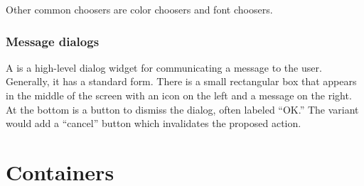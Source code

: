 Other common choosers are color choosers and font choosers.

\subsubsection{Message dialogs}
\label{sec:GUI:message-dialogs}

A  is a high-level dialog widget for
communicating a message to the user. Generally, it has a standard
form. There is a small rectangular box that appears in the middle of
the screen with an icon on the left and a message on the right. At the
bottom is a button to dismiss the dialog, often labeled ``OK.'' The
 variant would add a ``cancel'' button
which invalidates the proposed action.



\section{Containers}
\label{sec:GUI:basic-components-containers}





